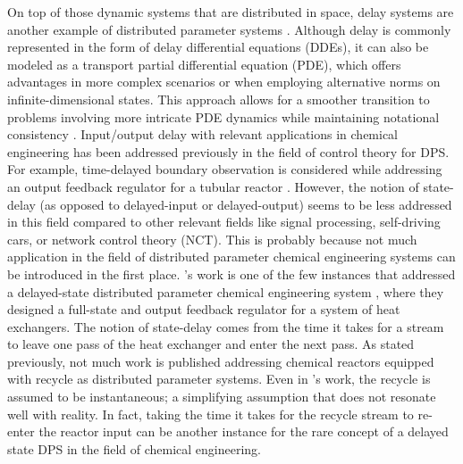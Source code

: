 On top of those dynamic systems that are distributed in space, delay systems are another example of distributed parameter systems \autocite{curtainbook}. Although delay is commonly represented in the form of delay differential equations (DDEs), it can also be modeled as a transport partial differential equation (PDE), which offers advantages in more complex scenarios or when employing alternative norms on infinite-dimensional states. This approach allows for a smoother transition to problems involving more intricate PDE dynamics while maintaining notational consistency \autocite{krstic2009book}. Input/output delay with relevant applications in chemical engineering has been addressed previously in the field of control theory for DPS. For example, time-delayed boundary observation is considered while addressing an output feedback regulator for a tubular reactor \autocite{Guilherme2019ACC}. However, the notion of state-delay (as opposed to delayed-input or delayed-output) seems to be less addressed in this field compared to other relevant fields like signal processing, self-driving cars, or network control theory (NCT). This is probably because not much application in the field of distributed parameter chemical engineering systems can be introduced in the first place. 's work is one of the few instances that addressed a delayed-state distributed parameter chemical engineering system \autocite{ozorio2019heat}, where they designed a full-state and output feedback regulator for a system of heat exchangers. The notion of state-delay comes from the time it takes for a stream to leave one pass of the heat exchanger and enter the next pass. As stated previously, not much work is published addressing chemical reactors equipped with recycle as distributed parameter systems. Even in 's work, the recycle is assumed to be instantaneous; a simplifying assumption that does not resonate well with reality. In fact, taking the time it takes for the recycle stream to re-enter the reactor input can be another instance for the rare concept of a delayed state DPS in the field of chemical engineering.

